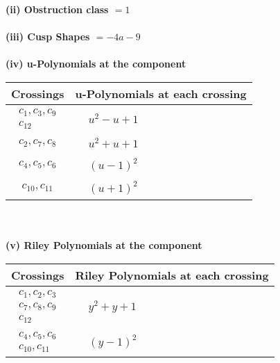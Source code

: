 \documentclass[1p]{elsarticle_modified}
\theoremstyle{definition}
\begin{document}
\flushleft \textbf{(ii) Obstruction class $= 1$}\\~\\
\flushleft \textbf{(iii) Cusp Shapes $= -4 a-9$}\\~\\
\newpage\renewcommand{\arraystretch}{1}
\flushleft \textbf{(iv) u-Polynomials at the component}\newline \\
\begin{tabular}{m{50pt}|m{274pt}}
Crossings & \hspace{64pt}u-Polynomials at each crossing \\
\hline $$\begin{aligned}c_{1},c_{3},c_{9}\\c_{12}\end{aligned}$$&$\begin{aligned}
&u^2- u+1
\end{aligned}$\\
\hline $$\begin{aligned}c_{2},c_{7},c_{8}\end{aligned}$$&$\begin{aligned}
&u^2+u+1
\end{aligned}$\\
\hline $$\begin{aligned}c_{4},c_{5},c_{6}\end{aligned}$$&$\begin{aligned}
&(u-1)^2
\end{aligned}$\\
\hline $$\begin{aligned}c_{10},c_{11}\end{aligned}$$&$\begin{aligned}
&(u+1)^2
\end{aligned}$\\
\hline
\end{tabular}\\~\\
\newpage\renewcommand{\arraystretch}{1}
\flushleft \textbf{(v) Riley Polynomials at the component}\newline \\
\begin{tabular}{m{50pt}|m{274pt}}
Crossings & \hspace{64pt}Riley Polynomials at each crossing \\
\hline $$\begin{aligned}c_{1},c_{2},c_{3}\\c_{7},c_{8},c_{9}\\c_{12}\end{aligned}$$&$\begin{aligned}
&y^2+y+1
\end{aligned}$\\
\hline $$\begin{aligned}c_{4},c_{5},c_{6}\\c_{10},c_{11}\end{aligned}$$&$\begin{aligned}
&(y-1)^2
\end{aligned}$\\
\hline
\end{tabular}\\~\\
\end{document}
